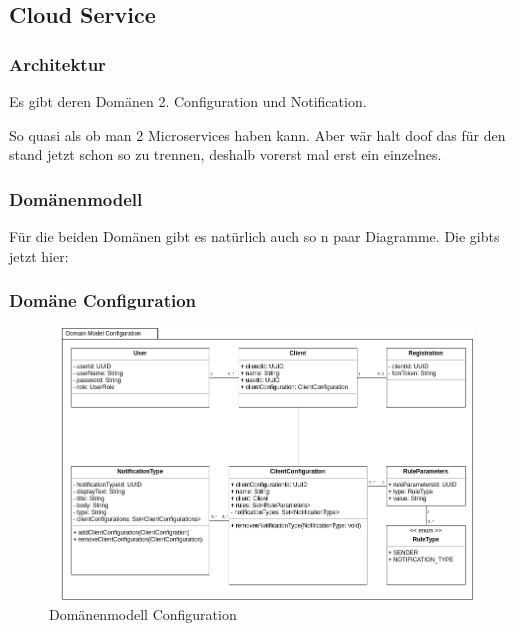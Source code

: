 
\subsection{Cloud Service}\label{subsec:cloud-service}

\subsubsection{Architektur}

Es gibt deren Domänen 2. Configuration und Notification.

So quasi als ob man 2 Microservices haben kann. Aber wär halt doof das für den stand jetzt schon so zu trennen, deshalb vorerst mal erst ein einzelnes.

\clearpage

\subsubsection{Domänenmodell}


Für die beiden Domänen gibt es natürlich auch so n paar Diagramme. Die gibts jetzt hier:


\subsubsection*{Domäne Configuration}

\begin{figure}[h]
    \centering
    \begin{minipage}[b]{1.0\textwidth}
        \includegraphics[width=\textwidth]{graphics/Class_Configuration_Domain}
        \caption{Domänenmodell Configuration}
    \end{minipage}
\end{figure}

